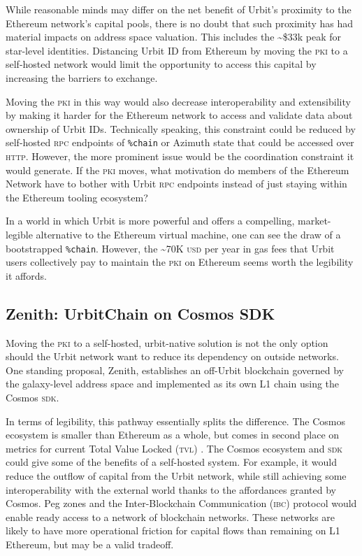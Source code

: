 \documentclass[twoside]{article}
\begin{document}
While reasonable minds may differ on the net benefit of Urbit's proximity to the Ethereum network's capital pools, there is no doubt that such proximity has had material impacts on address space valuation. This includes the \textasciitilde\$33k peak for star-level identities. Distancing Urbit ID from Ethereum by moving the \textsc{pki} to a self-hosted network would limit the opportunity to access this capital by increasing the barriers to exchange.

Moving the \textsc{pki} in this way would also decrease interoperability and extensibility by making it harder for the Ethereum network to access and validate data about ownership of Urbit IDs. Technically speaking, this constraint could be reduced by self-hosted \textsc{rpc} endpoints of \lstinline[style=inlinecode]{%chain} or Azimuth state that could be accessed over \textsc{http}. However, the more prominent issue would be the coordination constraint it would generate. If the \textsc{pki} moves, what motivation do members of the Ethereum Network have to bother with Urbit \textsc{rpc} endpoints instead of just staying within the Ethereum tooling ecosystem?

In a world in which Urbit is more powerful and offers a compelling, market-legible alternative to the Ethereum virtual machine, one can see the draw of a bootstrapped \lstinline[style=inlinecode]{%chain}. However, the \textasciitilde 70K \textsc{usd} per year in gas fees that Urbit users collectively pay to maintain the \textsc{pki} on Ethereum seems worth the legibility it affords.

\subsection[Zenith:  UrbitChain on Cosmos \textsc{sdk}]{Zenith:  UrbitChain on Cosmos SDK}

Moving the \textsc{pki} to a self-hosted, urbit-native solution is not the only option should the Urbit network want to reduce its dependency on outside networks. One standing proposal, Zenith, establishes an off-Urbit blockchain governed by the galaxy-level address space and implemented as its own L1 chain using the Cosmos \textsc{sdk}.

In terms of legibility, this pathway essentially splits the difference. The Cosmos ecosystem is smaller than Ethereum as a whole, but comes in second place on metrics for current Total Value Locked (\textsc{tvl}) \citep{CosmosTVL}.  The Cosmos ecosystem and \textsc{sdk} could give some of the benefits of a self-hosted system. For example, it would reduce the outflow of capital from the Urbit network, while still achieving some interoperability with the external world thanks to the affordances granted by Cosmos. Peg zones and the Inter-Blockchain Communication (\textsc{ibc}) protocol would enable ready access to a network of blockchain networks. These networks are likely to have more operational friction for capital flows than remaining on L1 Ethereum, but may be a valid tradeoff.
\end{document}
